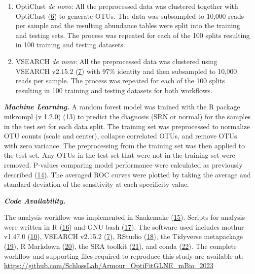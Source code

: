 \documentclass[
]{article}
\begin{document}
\begin{enumerate}
\def\labelenumi{\arabic{enumi}.}
\setcounter{enumi}{3}
\item
  OptiClust \emph{de novo}: All the preprocessed data was clustered
  together with OptiClust (\protect\hyperlink{ref-westcott2017}{6}) to
  generate OTUs. The data was subsampled to 10,000 reads per sample and
  the resulting abundance tables were split into the training and
  testing sets. The process was repeated for each of the 100 splits
  resulting in 100 training and testing datasets.
\item
  VSEARCH \emph{de novo}: All the preprocessed data was clustered using
  VSEARCH v2.15.2 (\protect\hyperlink{ref-rognes2016}{7}) with 97\%
  identity and then subsampled to 10,000 reads per sample. The process
  was repeated for each of the 100 splits resulting in 100 training and
  testing datasets for both workflows.
\end{enumerate}

\textbf{\emph{Machine Learning.}} A random forest model was trained with
the R package mikrompl (v 1.2.0)
(\protect\hyperlink{ref-topuxe7uoglu2021}{13}) to predict the diagnosis
(SRN or normal) for the samples in the test set for each data split. The
training set was preprocessed to normalize OTU counts (scale and
center), collapse correlated OTUs, and remove OTUs with zero variance.
The preprocessing from the training set was then applied to the test
set. Any OTUs in the test set that were not in the training set were
removed. P-values comparing model performance were calculated as
previously described (\protect\hyperlink{ref-topuxe7uoglu2020}{14}). The
averaged ROC curves were plotted by taking the average and standard
deviation of the sensitivity at each specificity value.

\textbf{\emph{Code Availability.}}

The analysis workflow was implemented in Snakemake
(\protect\hyperlink{ref-koster2012}{15}). Scripts for analysis were
written in R (\protect\hyperlink{ref-R2020}{16}) and GNU bash
(\protect\hyperlink{ref-GNUbash}{17}). The software used includes mothur
v1.47.0 (\protect\hyperlink{ref-schloss2009}{10}), VSEARCH v2.15.2
(\protect\hyperlink{ref-rognes2016}{7}), RStudio
(\protect\hyperlink{ref-RStudio2019}{18}), the Tidyverse metapackage
(\protect\hyperlink{ref-wickham2019}{19}), R Markdown
(\protect\hyperlink{ref-xie_r_2018}{20}), the SRA toolkit
(\protect\hyperlink{ref-noauthor_sra-tools_nodate}{21}), and conda
(\protect\hyperlink{ref-noauthor_anaconda_2016}{22}). The complete
workflow and supporting files required to reproduce this study are
available at:
\url{https://github.com/SchlossLab/Armour_OptiFitGLNE_mBio_2023}
\end{document}
